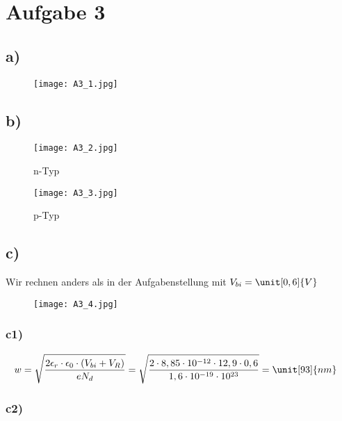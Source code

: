 \newpage

\section{Aufgabe 3}

\subsection*{a)}

\begin{figure}[h]
	\centering
	\texttt{[image: A3\_1.jpg]}
\end{figure}

\newpage

\subsection*{b)}


\begin{figure}[h]
	\centering
	\texttt{[image: A3\_2.jpg]}
	\caption{n-Typ}
\end{figure}


\begin{figure}[h]
	\centering
	\texttt{[image: A3\_3.jpg]}
	\caption{p-Typ}
\end{figure}

\newpage

\subsection*{c)}

Wir rechnen anders als in der Aufgabenstellung mit $V_{bi} = \unit[0,6]{V}$

\begin{figure}[h]
	\centering
	\texttt{[image: A3\_4.jpg]}
\end{figure}


\subsubsection{c1)}


\begin{align*}
w &= \sqrt{\frac{2 \epsilon_r \cdot \epsilon_0 \cdot \left( V_{bi} + V_R \right)}{e N_d}} = \sqrt{\frac{2 \cdot 8,85 \cdot 10^{-12} \cdot 12,9 \cdot 0,6}{1,6 \cdot 10^{-19} \cdot 10^{23}}} = \unit[93]{nm}
\end{align*}


\subsubsection{c2)}

